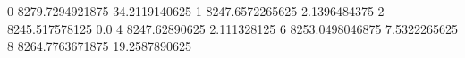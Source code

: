 0 8279.7294921875 34.2119140625
1 8247.6572265625 2.1396484375
2 8245.517578125 0.0
4 8247.62890625 2.111328125
6 8253.0498046875 7.5322265625
8 8264.7763671875 19.2587890625

